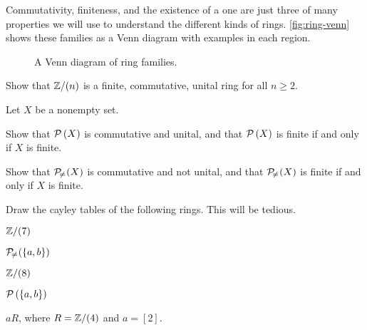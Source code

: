Commutativity, finiteness, and the existence of a one are just three of many properties we will use to understand the different kinds of rings. \autoref{fig:ring-venn} shows these families as a Venn diagram with examples in each region.
\begin{figure}[h]
\begin{center}
\caption{A Venn diagram of ring families. \label{fig:ring-venn}}
\end{center}
\end{figure}


\Exercises%

\begin{exercise}
Show that \(\mathbb{Z}/(n)\) is a finite, commutative, unital ring for all \(n \geq 2\).
\end{exercise}

\begin{exercise}
Let \(X\) be a nonempty set.
\begin{proplist}
\item Show that \(\mathcal{P}\left(X\right)\) is commutative and unital, and that \(\mathcal{P}\left(X\right)\) is finite if and only if \(X\) is finite.
\item Show that \(\mathcal{P}_{\!\neq\!}\left(X\right)\) is commutative and not unital, and that \(\mathcal{P}_{\!\neq\!}\left(X\right)\) is finite if and only if \(X\) is finite.
\end{proplist}
\end{exercise}

\begin{exercise}
Draw the cayley tables of the following rings. This will be tedious.
\begin{proplist*}
\item \(\mathbb{Z}/(7)\)
\item \(\mathcal{P}_{\!\neq\!}\left(\{a,b\}\right)\)
\item \(\mathbb{Z}/(8)\)
\item \(\mathcal{P}\left(\{a,b\}\right)\)
\item \(aR\), where \(R = \mathbb{Z}/(4)\) and \(a = [2]\).
\end{proplist*}
\end{exercise}

